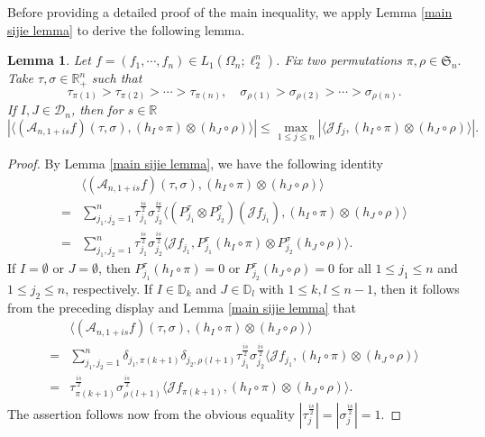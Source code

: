 \documentclass{amsart}
\numberwithin{equation}{section}
\newtheorem{lem}[thm]{Lemma}
\theoremstyle{definition}
\theoremstyle{remark}
\newcommand{\1}{\mathbf 1}
\begin{document}
Before providing a detailed proof of the main inequality, we apply Lemma \ref{main sijie lemma} to derive the following lemma.



\begin{lem}\label{selector lemma}
Let $f=(f_1, \cdots, f_n)\in L_1(\Omega_n;\ell_2^n)$. Fix two permutations $\pi,\rho\in\mathfrak{S}_n.$ Take $\tau,\sigma\in\mathbb{R}^n_+$ such that
$$\tau_{\pi(1)}>\tau_{\pi(2)}>\cdots>\tau_{\pi(n)},\quad \sigma_{\rho(1)}>\sigma_{\rho(2)}>\cdots>\sigma_{\rho(n)}.$$
If $I,J\in \mathcal{D}_n$, then for $s\in \mathbb{R}$
$$|\langle(\mathcal{A}_{n,1+is}f)(\tau,\sigma),(h_I\circ\pi)\otimes(h_J\circ\rho)\rangle|\leq\max_{1\leq j\leq n}|\langle\mathcal{J}f_j,(h_I\circ\pi)\otimes(h_J\circ\rho)\rangle|.$$
\end{lem}
\begin{proof}
By Lemma \ref{main sijie lemma}, we have the following identity
\begin{align*}
&\langle(\mathcal{A}_{n,1+is}f)(\tau,\sigma),(h_I\circ\pi)\otimes(h_J\circ\rho)\rangle\\
=&\sum_{j_1,j_2=1}^n\tau_{j_1}^{\frac{is}{2}}\sigma_{j_2}^{\frac{is}{2}}\langle (P_{j_1}^{\tau}\otimes P_{j_2}^{\sigma})(\mathcal{J}f_{j_1}),(h_I\circ\pi)\otimes(h_J\circ\rho)\rangle\\
=&\sum_{j_1,j_2=1}^n\tau_{j_1}^{\frac{is}{2}}\sigma_{j_2}^{\frac{is}{2}}\langle \mathcal{J}f_{j_1},P_{j_1}^{\tau}(h_I\circ\pi)\otimes P_{j_2}^{\sigma}(h_J\circ\rho)\rangle.
\end{align*}
If $I = \emptyset$ or $J = \emptyset$, then $P_{j_1}^{\tau}(h_I \circ \pi) = 0$ or $P_{j_2}^{\tau}(h_J \circ \rho) = 0$ for all $1 \leq j_1 \leq n$ and $1 \leq j_2 \leq n$, respectively. If $I\in\mathbb{D}_k$ and $J\in\mathbb{D}_l$ with $1\leq k,l\leq n-1$,  then it follows from the preceding display and Lemma \ref{main sijie lemma} that
\begin{align*}
&\langle(\mathcal{A}_{n,1+is}f)(\tau,\sigma),(h_I\circ\pi)\otimes(h_J\circ\rho)\rangle\\
=&\sum_{j_1,j_2=1}^n\delta_{j_1,\pi( k+1)}\delta_{j_2,\rho(l+1)}\tau_{j_1}^{\frac{is}{2}}\sigma_{j_2}^{\frac{is}{2}}\langle \mathcal{J}f_{j_1},(h_I\circ\pi)\otimes (h_J\circ\rho)\rangle\\
=&\tau_{\pi(k+1)}^{\frac{is}{2}}\sigma_{\rho(l+1)}^{\frac{is}{2}}\langle \mathcal{J}f_{\pi(k+1)},(h_I\circ\pi)\otimes (h_J\circ\rho)\rangle.
\end{align*}
The assertion follows now from the obvious equality $\left|\tau^{\frac{is}{2}}_j\right|=\left|\sigma^{\frac{is}{2}}_j\right|=1.$
\end{proof}
\end{document}
